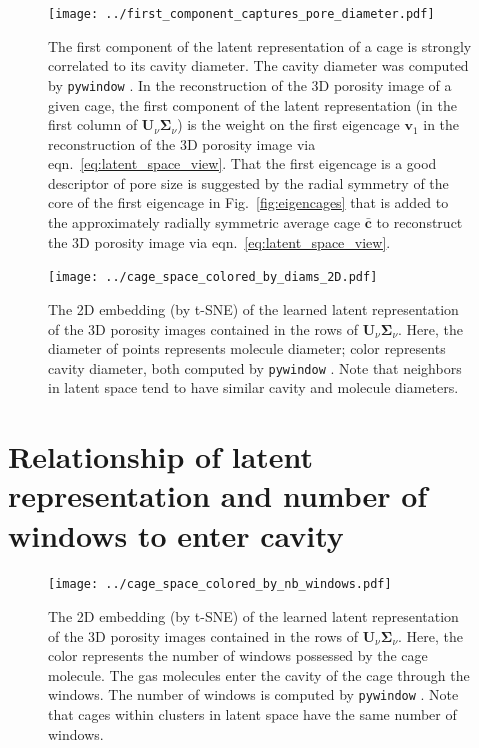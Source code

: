 \documentclass[journal=jacsat,manuscript=article]{achemso}
\begin{document}
\begin{figure}
\centering
	\texttt{[image: ../first\_component\_captures\_pore\_diameter.pdf]}
	\caption{The first component of the latent representation of a cage is strongly correlated to its cavity diameter. The cavity diameter was computed by \texttt{pywindow} \cite{miklitz2018pywindow}. In the reconstruction of the 3D porosity image of a given cage, the first component of the latent representation (in the first column of $\mathbf{U}_\nu \mathbf{\Sigma}_\nu$) is the weight on the first eigencage $\mathbf{v}_1$ in the reconstruction of the 3D porosity image via eqn.~\ref{eq:latent_space_view}. That the first eigencage is a good descriptor of pore size is suggested by the radial symmetry of the core of the first eigencage in Fig.~\ref{fig:eigencages} that is added to the approximately radially symmetric average cage $\bar{\mathbf{c}}$ to reconstruct the 3D porosity image via eqn.~\ref{eq:latent_space_view}.
	} \label{fig:first_component_captures_pore_diameter}
\end{figure}


\begin{figure}
\centering
	\texttt{[image: ../cage\_space\_colored\_by\_diams\_2D.pdf]}
	\caption{The 2D embedding (by t-SNE) of the learned latent representation of the 3D porosity images contained in the rows of $\mathbf{U}_\nu \mathbf{\Sigma}_\nu$. Here, the diameter of points represents molecule diameter; color represents cavity diameter, both computed by \texttt{pywindow} \cite{miklitz2018pywindow}. Note that neighbors in latent space tend to have similar cavity and molecule diameters.
	} \label{fig:cage_space_colored_by_diams_2D}
\end{figure}

\newpage
\clearpage

\section{Relationship of latent representation and number of windows to enter cavity}

\begin{figure}
\centering
	\texttt{[image: ../cage\_space\_colored\_by\_nb\_windows.pdf]}
	\caption{The 2D embedding (by t-SNE) of the learned latent representation of the 3D porosity images contained in the rows of $\mathbf{U}_\nu \mathbf{\Sigma}_\nu$. Here, the color represents the number of windows possessed by the cage molecule. The gas molecules enter the cavity of the cage through the windows. The number of windows is computed by \texttt{pywindow} \cite{miklitz2018pywindow}. Note that cages within clusters in latent space have the same number of windows.
	} \label{fig:cage_space_colored_by_nb_windows}
\end{figure}
\end{document}
